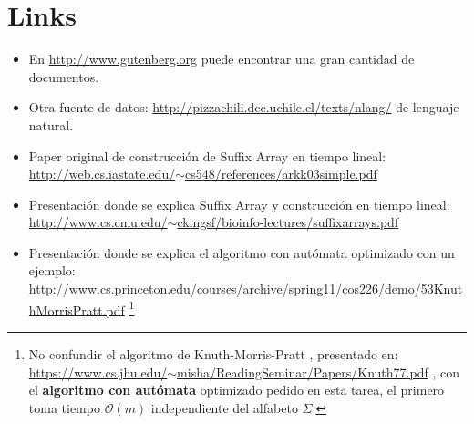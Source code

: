 \documentclass[dcc,uchile]{fcfmcourse}
\begin{document}
\section{Links}
\begin{itemize}
    \item En \href{http://www.gutenberg.org}{http://www.gutenberg.org} puede encontrar una gran cantidad de documentos.
    \item Otra fuente de datos: \href{http://pizzachili.dcc.uchile.cl/texts/nlang/}{http://pizzachili.dcc.uchile.cl/texts/nlang/} de lenguaje natural.
    \item Paper original de construcción de Suffix Array en tiempo lineal:\\ \href{http://web.cs.iastate.edu/~cs548/references/arkk03simple.pdf}{http://web.cs.iastate.edu/$\sim$cs548/references/arkk03simple.pdf}
    \item Presentación donde se explica Suffix Array y construcción en tiempo lineal:\\
    \href{http://www.cs.cmu.edu/~ckingsf/bioinfo-lectures/suffixarrays.pdf}{http://www.cs.cmu.edu/$\sim$ckingsf/bioinfo-lectures/suffixarrays.pdf}
    \item Presentación donde se explica el algoritmo con autómata optimizado con un ejemplo:\\
    \href{http://www.cs.princeton.edu/courses/archive/spring11/cos226/demo/53KnuthMorrisPratt.pdf}{http://www.cs.princeton.edu/courses/archive/spring11/cos226/demo/53KnuthMorrisPratt.pdf}  \footnote{No confundir el algoritmo de Knuth-Morris-Pratt , presentado en:\\ \href{https://www.cs.jhu.edu/~misha/ReadingSeminar/Papers/Knuth77.pdf}{https://www.cs.jhu.edu/$\sim$misha/ReadingSeminar/Papers/Knuth77.pdf} , con  el \textbf{algoritmo con autómata} optimizado pedido en esta tarea, el primero toma tiempo $\mathcal{O}(m)$ independiente del alfabeto $\Sigma$.}
\end{itemize}
\end{document}
